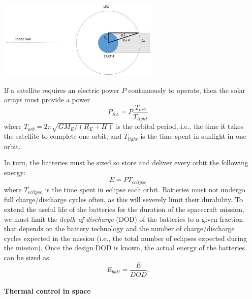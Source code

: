 \begin{center}
\includegraphics[width=0.6\textwidth]{figs/eclipse.jpg}
\end{center}

If a satellite requires an electric power $P$ continuously to operate,
then the solar arrays must provide a power
%
\begin{equation}
P_{SA} = P \frac{T_{orb}}{T_{light}}
\end{equation}
%
where $T_{orb} = 2\pi \sqrt{GM_E/(R_E +H)}$ is the orbital period, i.e., the
time it takes the satellite to complete one orbit, and $T_{light}$ is the
time spent in sunlight in one orbit.

In turn, the batteries must be sized so store and deliver every orbit the 
following energy:
%
\begin{equation}
E = P T_{eclipse}
\end{equation}
%
where $T_{eclipse}$ is the time spent in eclipse each orbit. Batteries must 
not undergo full charge/discharge cycles often, as this will severely limit
their durability. To extend the useful life of the batteries for the duration
of the spacecraft mission, we must limit the \emph{depth of discharge} (DOD) 
of the batteries to a given fraction that depends on the battery technology
and the number of charge/discharge cycles expected in the mission (i.e., the
total number of eclipses expected during the mission).
Once the design DOD is known, the actual energy of the batteries can be sized
as
%
\begin{equation}
E_{batt} = \frac{E}{DOD}.
\end{equation}

\paragraph{Thermal control in space}

